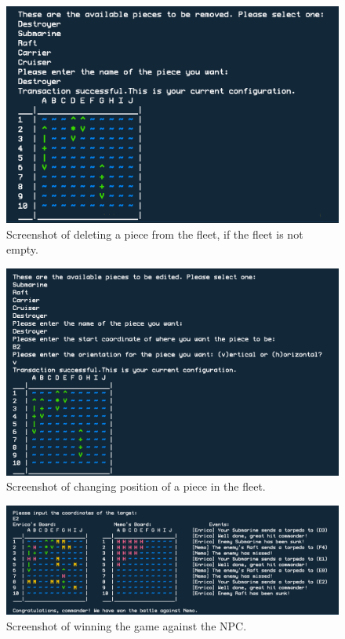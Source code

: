 \documentclass[11pt]{article} %
\begin{document}
\begin{figure}[H]
\centering
\includegraphics[scale=0.5]{images/delete_piece.png}
\caption{Screenshot of deleting a piece from the fleet, if the fleet is not empty.}
\end{figure}
\begin{figure}[H]
\centering
\includegraphics[scale=0.5]{images/change_pos.png}
\caption{Screenshot of changing position of a piece in the fleet.}
\end{figure}
\begin{figure}[H]
\centering
\includegraphics[scale=0.5]{images/win_game.png}
\caption{Screenshot of winning the game against the NPC.}
\end{figure}
\end{document}
